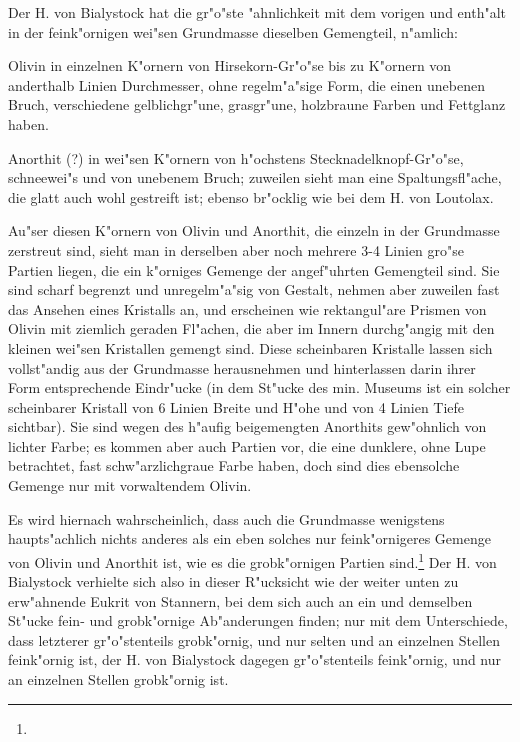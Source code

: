 \documentclass[a4paper, 11pt, oneside]{article}
\begin{document}
Der H. von Bialystock hat die gr"o"ste "ahnlichkeit mit dem vorigen und enth"alt in der feink"ornigen wei"sen Grundmasse dieselben Gemengteil, n"amlich:

Olivin in einzelnen K"ornern von Hirsekorn-Gr"o"se bis zu K"ornern von anderthalb Linien Durchmesser, ohne regelm"a"sige Form, die einen unebenen Bruch, verschiedene gelblichgr"une, grasgr"une, holzbraune Farben und Fettglanz haben.

Anorthit (?) in wei"sen K"ornern von h"ochstens Stecknadelknopf-Gr"o"se, schneewei"s und von unebenem Bruch; zuweilen sieht man eine Spaltungsfl"ache, die glatt auch wohl gestreift ist; ebenso br"ocklig wie bei dem H. von Loutolax.

Au"ser diesen K"ornern von Olivin und Anorthit, die einzeln in der Grundmasse zerstreut sind, sieht man in derselben aber noch mehrere 3-4 Linien gro"se Partien liegen, die ein k"orniges Gemenge der angef"uhrten Gemengteil sind. Sie sind scharf begrenzt und unregelm"a"sig von Gestalt, nehmen aber zuweilen fast das Ansehen eines Kristalls an, und erscheinen wie rektangul"are Prismen von Olivin mit ziemlich geraden Fl"achen, die aber im Innern durchg"angig mit den kleinen wei"sen Kristallen gemengt sind. Diese scheinbaren Kristalle lassen sich vollst"andig aus der Grundmasse herausnehmen und hinterlassen darin ihrer Form entsprechende Eindr"ucke (in dem St"ucke des min. Museums ist ein solcher scheinbarer Kristall von 6 Linien Breite und H"ohe und von 4 Linien Tiefe sichtbar). Sie sind wegen des h"aufig beigemengten Anorthits gew"ohnlich von lichter Farbe; es kommen aber auch Partien vor, die eine dunklere, ohne Lupe betrachtet, fast schw"arzlichgraue Farbe haben, doch sind dies ebensolche Gemenge nur mit vorwaltendem Olivin.

Es wird hiernach wahrscheinlich, dass auch die Grundmasse wenigstens haupts"achlich nichts anderes als ein eben solches nur feink"ornigeres Gemenge von Olivin und Anorthit ist, wie es die grobk"ornigen Partien sind.\footnote{} Der H. von Bialystock verhielte sich also in dieser R"ucksicht wie der weiter unten zu erw"ahnende Eukrit von Stannern, bei dem sich auch an ein und demselben St"ucke fein- und grobk"ornige Ab"anderungen finden; nur mit dem Unterschiede, dass letzterer gr"o"stenteils grobk"ornig, und nur selten und an einzelnen Stellen feink"ornig ist, der H. von Bialystock dagegen gr"o"stenteils feink"ornig, und nur an einzelnen Stellen grobk"ornig ist.
\end{document}

